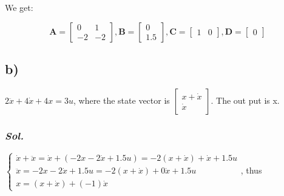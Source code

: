     We get:

    \begin{equation}
        \textbf{A} =
        \begin{bmatrix}
            0 & 1 \\
            -2 & -2
        \end{bmatrix}, 
        \textbf{B} =
        \begin{bmatrix}
            0\\
            1.5
        \end{bmatrix}, 
        \textbf{C} =
        \begin{bmatrix}
            1 & 0
        \end{bmatrix}, 
        \textbf{D} =
        \begin{bmatrix}
            0
        \end{bmatrix}
    \end{equation}

    \subsection{b)} 
    $2\ddot{x} + 4\dot{x} + 4x=3u$, where the state vector is 
    $\begin{bmatrix}
        x + \dot{x} \\
        \dot{x}
    \end{bmatrix}$.
    The out put is x.

    \subsubsection{\textit{ Sol. }}
    $\left\{
        \begin{array}{lr}
        \dot{x} + \ddot{x} = \dot{x} + (-2x -2\dot{x} + 1.5u) = -2(x + \dot{x}) + \dot{x} + 1.5u\\
        \ddot{x} = -2x -2\dot{x} + 1.5u = -2(x + \dot{x}) + 0\dot{x} + 1.5u \\
        x = (x + \dot{x}) + (-1)\dot{x}
        \end{array}
    \right.$, thus

